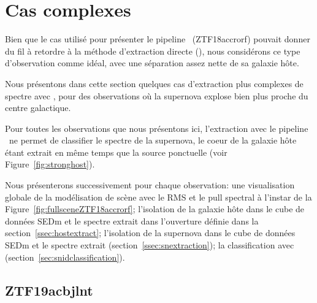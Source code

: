 \documentclass[../main/main.tex]{subfiles}
\begin{document}
\section{Cas complexes}

Bien que le cas utilisé pour présenter le pipeline \hypergal\
(ZTF18accrorf) pouvait donner du
fil à retordre à la méthode d'extraction directe (\pysedm), nous
considérons ce type d'observation comme idéal, avec une séparation assez
nette de sa galaxie hôte.

Nous présentons dans cette section quelques cas d'extraction plus
complexes de spectre avec \hypergal, pour des observations où la supernova explose
bien plus proche du centre galactique.

Pour toutes les observations que nous présentons ici, l'extraction avec le pipeline
\pysedm\ ne permet de classifier le spectre de la supernova, le coeur de
la galaxie hôte étant extrait en même temps que la source ponctuelle
(voir Figure~\ref{fig:stronghost}).

Nous présenterons successivement pour chaque observation: une visualisation globale de la
modélisation de scène avec le RMS et le pull spectral
à l'instar de la Figure~\ref{fig:fullsceneZTF18accrorf}; l'isolation de
la galaxie hôte dans le cube de données SEDm
et le spectre extrait dans l'ouverture définie dans la section~\ref{ssec:hostextract};
l'isolation de la supernova dans le cube de données SEDm et le spectre
extrait (section~\ref{ssec:snextraction}); la
classification avec  (section~\ref{sec:snidclassification}). 

\subsection{ZTF19acbjlnt}
\end{document}
